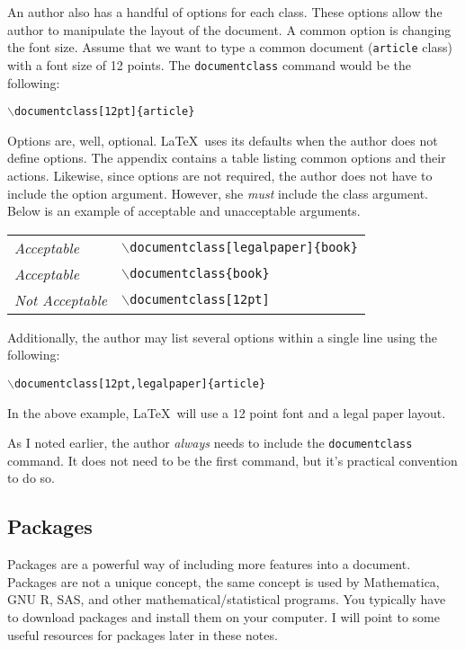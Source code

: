 \documentclass{article}
\begin{document}
An author also has a handful of options for each class. These options allow the author to manipulate the layout of the document. A common option is changing the font size. Assume that we want to type a common document (\texttt{article} class) with a font size of 12 points. The \texttt{documentclass} command would be the following:
\begin{center}
	\texttt{$\backslash$documentclass[12pt]\{article\}}
\end{center}

Options are, well, optional. \LaTeX\ uses its defaults when the author does not define options. The appendix contains a table listing common options and their actions. Likewise, since options are not required, the author does not have to include the option argument. However, she \emph{must} include the class argument. Below is an example of acceptable and unacceptable arguments.
\begin{center}
	\begin{tabular}{l l}
		\textit{Acceptable} & \texttt{$\backslash$documentclass[legalpaper]\{book\}} \\
		\textit{Acceptable} & \texttt{$\backslash$documentclass\{book\}} \\
		\textit{Not Acceptable} & \texttt{$\backslash$documentclass[12pt]} \\
	\end{tabular}
\end{center}
Additionally, the author may list several options within a single line using the following:
\begin{center}
	\texttt{$\backslash$documentclass[12pt,legalpaper]\{article\}}
\end{center}
In the above example, \LaTeX\ will use a 12 point font and a legal paper layout.

As I noted earlier, the author \emph{always} needs to include the \texttt{documentclass} command. It does not need to be the first command, but it's practical convention to do so.

\subsection{Packages}

Packages are a powerful way of including more features into a document. Packages are not a unique concept, the same concept is used by Mathematica, GNU R, SAS, and other mathematical/statistical programs. You typically have to download packages and install them on your computer. I will point to some useful resources for packages later in these notes.
\end{document}
